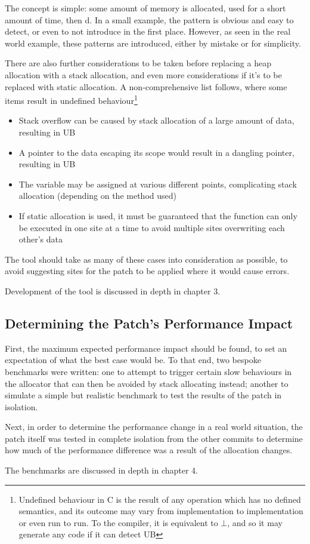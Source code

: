 The concept is simple: some amount of memory is allocated, used for a short amount of time, then \free{}d. In a small example, the pattern is obvious and easy to detect, or even to not introduce in the first place. However, as seen in the real world  example, these patterns are introduced, either by mistake or for simplicity.

There are also further considerations to be taken before replacing a heap allocation with a stack allocation, and even more considerations if it's to be replaced with static allocation. A non-comprehensive list follows, where some items result in undefined behaviour\footnote{Undefined behaviour in C is the result of any operation which has no defined semantics, and its outcome may vary from implementation to implementation or even run to run. To the compiler, it is equivalent to $\bot$, and so it may generate any code if it can detect UB}

\begin{itemize}
	\item Stack overflow can be caused by stack allocation of a large amount of data, resulting in UB
	\item A pointer to the data escaping its scope would result in a dangling pointer, resulting in UB
	\item The variable may be assigned at various different points, complicating stack allocation (depending on the method used)
	\item If static allocation is used, it must be guaranteed that the function can only be executed in one site at a time to avoid multiple sites overwriting each other's data
\end{itemize}

The tool should take as many of these cases into consideration as possible, to avoid suggesting sites for the patch to be applied where it would cause errors.

Development of the tool is discussed in depth in chapter 3.

\subsection{Determining the Patch's Performance Impact}

First, the maximum expected performance impact should be found, to set an expectation of what the best case would be. To that end, two bespoke benchmarks were written: one to attempt to trigger certain slow behaviours in the allocator that can then be avoided by stack allocating instead; another to simulate a simple but realistic benchmark to test the results of the patch in isolation.

Next, in order to determine the performance change in a real world situation, the  patch itself was tested in complete isolation from the other commits to determine how much of the performance difference was a result of the allocation changes.

The benchmarks are discussed in depth in chapter 4.

